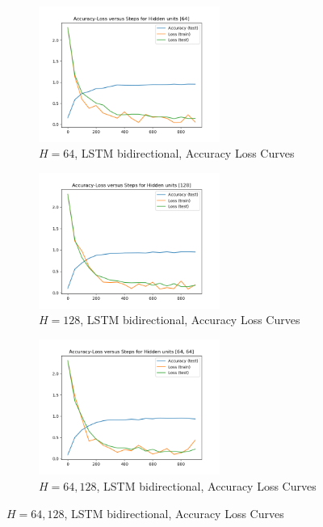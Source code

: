 \begin{figure}[!htbp]
\begin{subfigure}
\centering
\includegraphics[angle=0,width=0.65\textwidth]{assign-3/logs/Q1-MNIST-LSTM-[64].png}
\caption{$H=64$, LSTM bidirectional, Accuracy Loss Curves}
\end{subfigure}
\begin{subfigure}
\centering
\includegraphics[angle=0,width=0.65\textwidth]{assign-3/logs/Q1-MNIST-LSTM-[128].png}
\caption{$H=128$, LSTM bidirectional, Accuracy Loss Curves}
\end{subfigure}
\begin{subfigure}
\centering
\includegraphics[angle=0,width=0.65\textwidth]{assign-3/logs/Q1-MNIST-LSTM-[64, 64].png}
\caption{$H=64, 128$, LSTM bidirectional, Accuracy Loss Curves}
\end{subfigure}
\end{figure}

